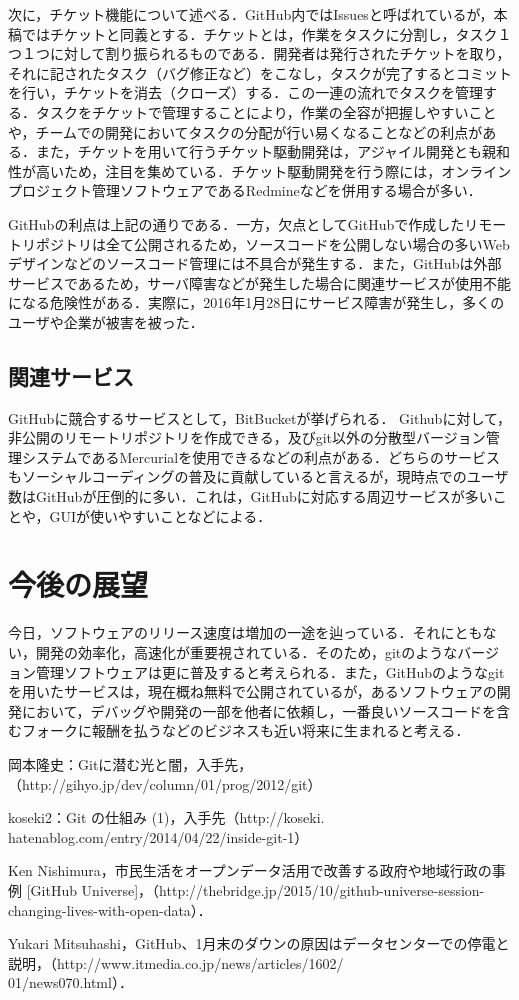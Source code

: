 \documentclass[a4j,9pt,twocolumn]{jsarticle}
\begin{document}
次に，チケット機能について述べる．GitHub内ではIssuesと呼ばれているが，本稿ではチケットと同義とする．チケットとは，作業をタスクに分割し，タスク１つ１つに対して割り振られるものである．開発者は発行されたチケットを取り，それに記されたタスク（バグ修正など）をこなし，タスクが完了するとコミットを行い，チケットを消去（クローズ）する．この一連の流れでタスクを管理する．タスクをチケットで管理することにより，作業の全容が把握しやすいことや，チームでの開発においてタスクの分配が行い易くなることなどの利点がある．また，チケットを用いて行うチケット駆動開発は，アジャイル開発とも親和性が高いため，注目を集めている．チケット駆動開発を行う際には，オンラインプロジェクト管理ソフトウェアであるRedmineなどを併用する場合が多い．

GitHubの利点は上記の通りである．一方，欠点としてGitHubで作成したリモートリポジトリは全て公開されるため，ソースコードを公開しない場合の多いWebデザインなどのソースコード管理には不具合が発生する．また，GitHubは外部サービスであるため，サーバ障害などが発生した場合に関連サービスが使用不能になる危険性がある．実際に，2016年1月28日にサービス障害が発生し，多くのユーザや企業が被害を被った\cite{news}．

\subsection{関連サービス}
GitHubに競合するサービスとして，BitBucketが挙げられる． Githubに対して，非公開のリモートリポジトリを作成できる，及びgit以外の分散型バージョン管理システムであるMercurialを使用できるなどの利点がある．どちらのサービスもソーシャルコーディングの普及に貢献していると言えるが，現時点でのユーザ数はGitHubが圧倒的に多い．これは，GitHubに対応する周辺サービスが多いことや，GUIが使いやすいことなどによる．

\section{今後の展望}
今日，ソフトウェアのリリース速度は増加の一途を辿っている．それにともない，開発の効率化，高速化が重要視されている．そのため，gitのようなバージョン管理ソフトウェアは更に普及すると考えられる．また，GitHubのようなgitを用いたサービスは，現在概ね無料で公開されているが，あるソフトウェアの開発において，デバッグや開発の一部を他者に依頼し，一番良いソースコードを含むフォークに報酬を払うなどのビジネスも近い将来に生まれると考える．

\small
\begin{thebibliography}{99}
岡本隆史：Gitに潜む光と闇，入手先，（http://gihyo.jp/dev/column/01/prog/2012/git）

koseki2：Git の仕組み (1)，入手先（http://koseki.\\hatenablog.com/entry/2014/04/22/inside-git-1）

Ken Nishimura，市民生活をオープンデータ活用で改善する政府や地域行政の事例 [GitHub Universe]，（http://thebridge.jp/2015/10/github-universe-session-changing-lives-with-open-data）．

Yukari Mitsuhashi，GitHub、1月末のダウンの原因はデータセンターでの停電と説明，（http://www.itmedia.co.jp/news/articles/1602/\\01/news070.html）．
\end{thebibliography}
\end{document}
